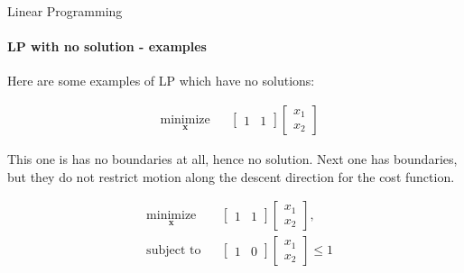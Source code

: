 \documentclass{beamer}
\begin{document}
\begin{frame}{Linear Programming}
\framesubtitle{LP with no solution - examples}
\begin{flushleft}

Here are some examples of LP which have no solutions:

\begin{equation}
\begin{aligned}
& \underset{\mathbf{x}}{\text{minimize}}
& & \begin{bmatrix} 1 & 1 \end{bmatrix} 
\begin{bmatrix} x_1 \\ x_2 \end{bmatrix}
\end{aligned}
\end{equation}

This one is has no boundaries at all, hence no solution. Next one has boundaries, but they do not restrict motion along the descent direction for the cost function.

\begin{equation}
\begin{aligned}
& \underset{\mathbf{x}}{\text{minimize}}
& & \begin{bmatrix} 1 & 1 \end{bmatrix} 
\begin{bmatrix} x_1 \\ x_2 \end{bmatrix} , \\
& \text{subject to}
& & \begin{bmatrix} 1 & 0 \end{bmatrix}
\begin{bmatrix} x_1 \\ x_2 \end{bmatrix} \leq
1
%
\end{aligned}
\end{equation}

 
\end{flushleft}
\end{frame}
\end{document}
